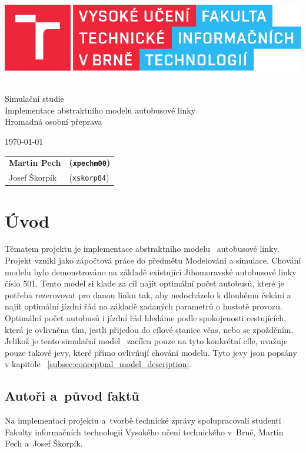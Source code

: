 \documentclass[a4paper]{article}
\newcommand{\logo} {
    \includegraphics[scale=0.8, keepaspectratio]{fig/logo.pdf}
}
\begin{document}
    \begin{titlepage}
        \begin{center}
            \logo
            \\
            {\Huge Simulační studie}\\\medskip
            {\LARGE Implementace abstraktního modelu autobusové linky}\\\medskip
            {\large	Hromadná osobní přeprava}
        \end{center}
        {\Large \today \hfill
        \begin{tabular}{l l}
            \textbf{Martin Pech} & \textbf{(\texttt{xpechm00})} \\
            Josef Škorpík & (\texttt{xskorp04})
        \end{tabular}}
    \end{titlepage}

    \newpage

	\section{Úvod}
    \label{sec:intro}

    Tématem projektu je implementace abstraktního modelu~\cite[snímek 10]{IMS_slides} autobusové linky.
    Projekt vznikl jako zápočtová práce do předmětu Modelování a simulace. Chování modelu bylo demonstrováno na základě existující Jihomoravské autobusové linky číslo 501. Tento model si klade za cíl najít optimální počet autobusů, které je potřeba rezerovovat pro danou linku tak, aby nedocházelo k dlouhému čekání a najít optimální jízdní řád na základě zadaných parametrů o hustotě provozu. Optimální počet autobusů i jízdní řád hledáme podle spokojenosti cestujících, která je ovlivněna tím, jestli přijedou do cílové stanice včas, nebo se zpožděním. Jelikož je tento simulační model~\cite[snímek 44]{IMS_slides} zacílen pouze na tyto konkrétní cíle, uvažuje pouze takové jevy, které přímo ovlivňují chování modelu. Tyto jevy jsou popsány v kapitole ~\ref{subsec:conceptual_model_description}.

        \subsection{Autoři a~původ faktů}
        \label{subsec:authors}

            Na implementaci projektu a~tvorbě technické zprávy spolupracovali studenti Fakulty informačních technologií Vysokého učení technického v~Brně, Martin Pech a~Josef Škorpík.
            
\end{document}
